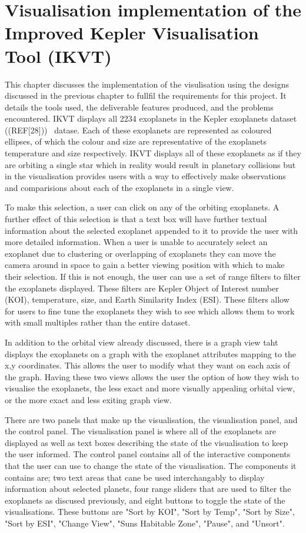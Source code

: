 \chapter{Visualisation implementation of the Improved Kepler Visualisation Tool (IKVT)}\label{C:sd}
This chapter discusses the implementation of the visulisation using the designs
discussed in the previous chapter to fullfil the requirements for this project. It details the tools used, the deliverable features
produced, and the problems encountered. IKVT displays all 2234 exoplanets
in the Kepler exoplanets dataset ((REF[28]))~ datase. Each of these exoplanets are represented as coloured
ellipses, of which the colour and size are representative of the exoplanets
temperature and size respectively. IKVT displays all of these exoplanets as if
they are orbiting a single star which in reality would result in planetary
collisions but in the visualisation provides users with a way to effectively
make observations and comparisions about each of the exoplanets in a single
view. 

To make this selection, a user can click on any of the orbiting exoplanets.  A
further effect of this selection is that a text box will have further textual
information about the selected exoplanet appended to it to provide the user with
more detailed information. When a user is unable to accurately select an exoplanet due to clustering or
overlapping of exoplanets they can move the camera around in space to gain a
better viewing position with which to make their selection. If this is not
enough, the user can use a set of range filters to filter the exoplanets
displayed. These filters are Kepler Object of Interest number (KOI),
temperature, size, and Earth Similarity Index (ESI). These filters allow for
users to fine tune the exoplanets they wish to see which allows them to work
with small multiples rather than the entire dataset.

In addition to the orbital view already discussed, there is a graph view taht
displays the exoplanets on a graph with the exoplanet attributes mapping to the
x,y coordinates. This allows the user to modify what they want on each axis of
the graph. Having these two views allows the user the option of how they wish to
visualise the exoplanets, the less exact and more visually appealing orbital
view, or the more exact and less exiting graph view.

There are two panels that make up the visualisation, the visualisation panel,
and the control panel. The visualisation panel is where all of the exoplanets
are displayed as well as text boxes describing the state of the visualisation to
keep the user informed. The control panel contains all of the interactive
components that the user can use to change the state of the visualisation. The
components it contains are; two text areas that cane be used interchangably to
display information about selected planets, four range sliders that are used to
filter the exoplanets as discused previously, and eight buttons to toggle the
state of the visualisations. These buttons are "Sort by KOI", "Sort by Temp",
"Sort by Size", "Sort by ESI", "Change View", "Suns Habitable Zone", "Pause",
and "Unsort". ~

